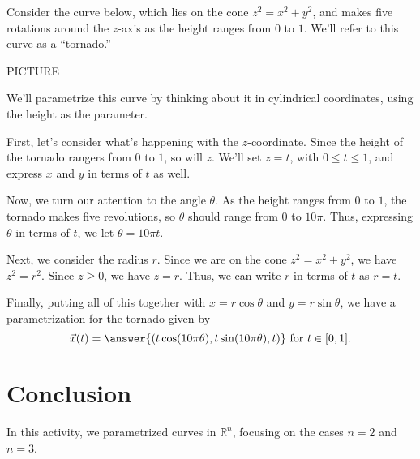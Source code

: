 \documentclass{ximera}
\begin{document}
\begin{example}
Consider the curve below, which lies on the cone $z^2 = x^2 + y^2$, and makes five rotations around the $z$-axis as the height ranges from $0$ to $1$. We'll refer to this curve as a ``tornado.''

PICTURE

We'll parametrize this curve by thinking about it in cylindrical coordinates, using the height as the parameter.

First, let's consider what's happening with the $z$-coordinate. Since the height of the tornado rangers from $0$ to $1$, so will $z$. We'll set $z = t$, with $0\leq t\leq 1$, and express $x$ and $y$ in terms of $t$ as well.

Now, we turn our attention to the angle $\theta$. As the height ranges from $0$ to $1$, the tornado makes five revolutions, so $\theta$ should range from $0$ to $10\pi$. Thus, expressing $\theta$ in terms of $t$, we let $\theta = 10\pi t$.

Next, we consider the radius $r$. Since we are on the cone $z^2 = x^2 + y^2$, we have $z^2 = r^2$. Since $z\geq 0$, we have $z = r$. Thus, we can write $r$ in terms of $t$ as $r = t$.

Finally, putting all of this together with $x = r\cos\theta$ and $y = r\sin\theta$, we have a parametrization for the tornado given by
\[
\vec{x}(t) = \answer{(t\cos(10\pi\theta), t\sin(10\pi\theta), t)} \textrm{ for } t\in [0,1].
\]

\end{example}

\section{Conclusion}

In this activity, we parametrized curves in $\mathbb{R}^n$, focusing on the cases $n=2$ and $n=3$.
\end{document}
